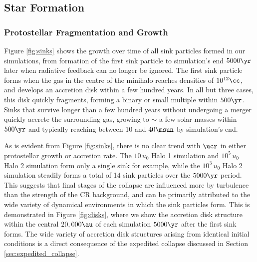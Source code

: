 \subsection{Star Formation}
\subsubsection{Protostellar Fragmentation and Growth}
\label{subsec:sink_formation}

Figure \ref{fig:sinks} shows the growth over time of all sink particles formed in our simulations, from formation of the first sink particle to simulation's end $5000\yr$ later when radiative feedback can no longer be ignored. 
The first sink particle forms when the gas in the centre of the minihalo reaches densities of $10^{12}\cc$, and develops an accretion disk within a few hundred years. 
In all but three cases, this disk quickly fragments, forming a binary or small multiple within $500\yr$. 
Sinks that survive longer than a few hundred years without undergoing a merger quickly accrete the surrounding gas, growing to $\sim$ a few solar masses within $500\yr$ and typically reaching between 10 and $40\msun$ by simulation's end.

As is evident from Figure \ref{fig:sinks}, there is no clear trend with $\ucr$ in either protostellar growth or accretion rate.
The $10\,u_0$ Halo 1 simulation and $10^5\,u_0$ Halo 2 simulation form only a single sink for example, while the $10^3\,u_0$ Halo 2 simulation steadily forms a total of 14 sink particles over the $5000\yr$ period.
This suggests that final stages of the collapse are influenced more by turbulence than the strength of the CR background, and can be primarily attributed to the wide variety of dynamical environments in which the sink particles form.
This is demonstrated in Figure \ref{fig:disks}, where we show the accretion disk structure within the central $20,000\au$ of each simulation $5000\yr$ after the first sink forms.
The wide variety of accretion disk structures arising from identical initial conditions is a direct consequence of the expedited collapse discussed in Section \ref{sec:expedited_collapse}.